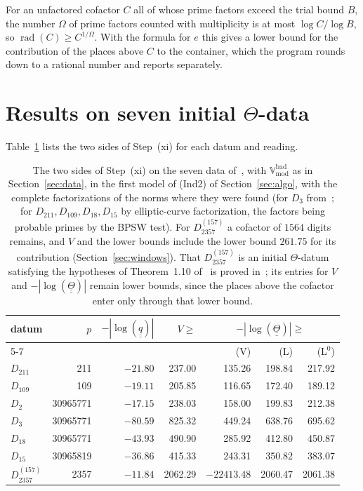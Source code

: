 \documentclass[11pt,a4paper]{article}
\newcommand{\qq}{\underline{\underline{q}}{}}
\newcommand{\Th}{\underline{\underline{\Theta}}{}}
\newcommand{\Vbad}{\mathbb{V}^{\mathrm{bad}}_{\mathrm{mod}}}
\begin{document}
For an unfactored cofactor $C$ all of whose prime factors exceed the trial bound $B$, the number $\Omega$ of prime
factors counted with multiplicity is at most $\log C/\log B$, so $\operatorname{rad}(C)\ge C^{1/\Omega}$. With the
formula for $e$ this gives a lower bound for the contribution of the places above $C$ to the container, which the
program rounds down to a rational number and reports separately.

\section{Results on seven initial \texorpdfstring{$\Theta$}{Theta}-data}\label{sec:results}

Table~\ref{tab:results} lists the two sides of Step~(xi) for each datum and reading.

\begin{table}[H]
\centering\small
\begin{tabular}{lrrrrrr}
\toprule
datum & $p$ & $-|\log(\qq)|$ & $V\ge$ & \multicolumn{3}{c}{$-|\log(\Th)|\ge$}\\
\cmidrule(lr){5-7}
 & & & & (V) & (L) & (L$^0$)\\
\midrule
$D_{211}$ & 211 & $-21.80$ & 237.00 & 135.26 & 198.84 & 217.92\\
$D_{109}$ & 109 & $-19.11$ & 205.85 & 116.65 & 172.40 & 189.12\\
$D_{2}$ & 30965771 & $-17.15$ & 238.03 & 158.00 & 199.83 & 212.38\\
$D_{3}$ & 30965771 & $-80.59$ & 825.32 & 449.24 & 638.76 & 695.62\\
$D_{18}$ & 30965771 & $-43.93$ & 490.90 & 285.92 & 412.80 & 450.87\\
$D_{15}$ & 30965819 & $-36.86$ & 415.33 & 243.31 & 350.82 & 383.07\\
$D_{2357}^{(157)}$ & 2357 & $-11.84$ & 2062.29 & $-22413.48$ & 2060.47 & 2061.38\\
\bottomrule
\end{tabular}
\caption{The two sides of Step~(xi) on the seven data of~\cite{Cat}, with $\Vbad$ as in Section~\ref{sec:data}, in the
first model of (Ind2) of Section~\ref{sec:algo}, with the
complete factorizations of the norms where they were found (for $D_{3}$ from~\cite{Cat}; for
$D_{211},D_{109},D_{18},D_{15}$ by elliptic-curve factorization, the factors being probable primes by the BPSW test).
For $D_{2357}^{(157)}$ a cofactor of $1564$ digits remains, and $V$ and the lower bounds include the lower bound
$261.75$ for its contribution (Section~\ref{sec:windows}). That $D_{2357}^{(157)}$ is an initial $\Theta$-datum
satisfying the hypotheses of Theorem~1.10 of~\cite{IUT4} is proved in~\cite[Theorem~2.1]{Fourteen}; its entries for
$V$ and $-|\log(\Th)|$ remain lower bounds, since the places above the cofactor enter only through that lower
bound.}\label{tab:results}
\end{table}
\end{document}
